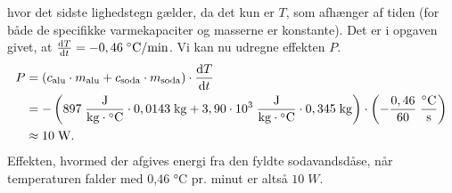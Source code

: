\documentclass{report}
\begin{document}
hvor det sidste lighedstegn gælder, da det kun er $T$, som afhænger af tiden (for både de specifikke varmekapaciter og masserne er konstante).
Det er i opgaven givet, at $\dv{T}{t}=-0,46 \;\unit{\celsius/min}$.
Vi kan nu udregne effekten $P$.
\begin{equation*}
\begin{split}
  P&=\left(c _{\text{alu}}\cdot m _{\text{alu}} + c _{\text{soda}} \cdot m _{\text{soda}}\right) \cdot \dv{T}{t}\\
  &=-\left(897 \;\unit{\frac{J}{kg \cdot \celsius}} \cdot 0,0143 \;\unit{kg} +3,90 \cdot 10^3 \;\unit{\frac{J}{kg \cdot \celsius}} \cdot 0,345 \;\unit{kg} \right) \cdot \left(-\frac{0,46}{60} \;\unit{\frac{\celsius}{s}}\right) \\
  &\approx 10 \;\unit{W}.
\end{split}
\end{equation*}
Effekten, hvormed der afgives energi fra den fyldte sodavandsdåse, når temperaturen falder med 0,46 °C pr. minut er altså $10 \;\unit{W} $.
\end{document}
